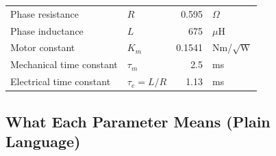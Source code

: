 \documentclass[11pt,a4paper]{article}
\begin{document}
\begin{table}[H]
\begin{tabular}{llrl}
Phase resistance                & $R$                  & 0.595   & $\Omega$ \\
Phase inductance                & $L$                  & 675     & $\mu$H \\
Motor constant                  & $K_m$                & 0.1541  & Nm/$\sqrt{\text{W}}$ \\
Mechanical time constant        & $\tau_m$             & 2.5     & ms \\
Electrical time constant        & $\tau_e = L/R$       & 1.13    & ms \\
\bottomrule
\end{tabular}
\end{table}


\subsection{What Each Parameter Means (Plain Language)}
\end{document}
